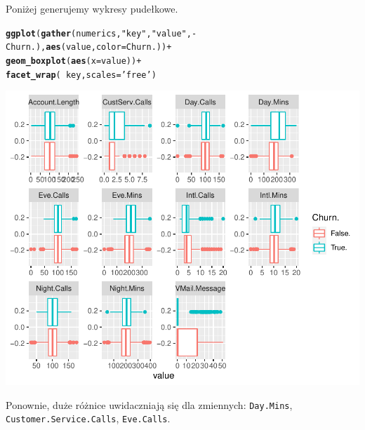\documentclass{article}\usepackage[]{graphicx}\usepackage[]{color}
\makeatletter
\def\maxwidth{ %
  \ifdim\Gin@nat@width>\linewidth
    \linewidth
  \else
    \Gin@nat@width
  \fi
}
\newcommand{\hlstr}[1]{\textcolor[rgb]{0.192,0.494,0.8}{#1}}%
\newcommand{\hlopt}[1]{\textcolor[rgb]{0,0,0}{#1}}%
\newcommand{\hlstd}[1]{\textcolor[rgb]{0.345,0.345,0.345}{#1}}%
\newcommand{\hlkwc}[1]{\textcolor[rgb]{0.333,0.667,0.333}{#1}}%
\newcommand{\hlkwd}[1]{\textcolor[rgb]{0.737,0.353,0.396}{\textbf{#1}}}%
\newenvironment{kframe}{%
 \def\at@end@of@kframe{}%
 \ifinner\ifhmode%
  \def\at@end@of@kframe{\end{minipage}}%
  \begin{minipage}{\columnwidth}%
 \fi\fi%
 \def\FrameCommand##1{\hskip\@totalleftmargin \hskip-\fboxsep
 \colorbox{shadecolor}{##1}\hskip-\fboxsep
     \hskip-\linewidth \hskip-\@totalleftmargin \hskip\columnwidth}%
 \MakeFramed {\advance\hsize-\width
   \@totalleftmargin\z@ \linewidth\hsize
   \@setminipage}}%
 {\par\unskip\endMakeFramed%
 \at@end@of@kframe}
\newenvironment{knitrout}{}{} %
\makeatother
\begin{document}
Poniżej generujemy wykresy pudełkowe. 
\begin{knitrout}
\color{fgcolor}\begin{kframe}
\begin{alltt}
\hlkwd{ggplot}\hlstd{(}\hlkwd{gather}\hlstd{(numerics,} \hlstr{"key"}\hlstd{,} \hlstr{"value"}\hlstd{,} \hlopt{-}\hlstd{Churn.),} \hlkwd{aes}\hlstd{(value,} \hlkwc{color}\hlstd{=Churn.))} \hlopt{+}
  \hlkwd{geom_boxplot}\hlstd{(}\hlkwd{aes}\hlstd{(}\hlkwc{x}\hlstd{=value))} \hlopt{+}
  \hlkwd{facet_wrap}\hlstd{(}\hlopt{~}\hlstd{key,} \hlkwc{scales}\hlstd{=}\hlstr{'free'}\hlstd{)}
\end{alltt}
\end{kframe}

{\centering \includegraphics[width=\maxwidth]{figure/Boxplot-1} 

}



\end{knitrout}
Ponownie, duże różnice uwidaczniają się dla zmiennych: \verb|Day.Mins|, \verb|Customer.Service.Calls|, \verb|Eve.Calls|.
\end{document}
